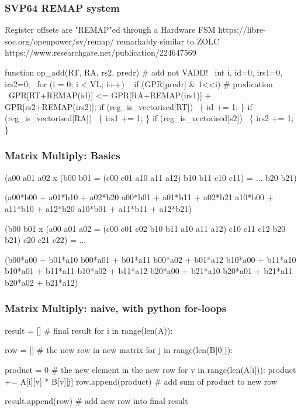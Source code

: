 \documentclass[slidestop]{beamer}
\begin{document}
\begin{frame}[fragile]
\frametitle{SVP64 REMAP system}

\begin{semiverbatim}
Register offsets are "REMAP"ed through a Hardware FSM
https://libre-soc.org/openpower/sv/remap/
remarkably similar to ZOLC
https://www.researchgate.net/publication/224647569

function op\_add(RT, RA, rs2, predr) # add not VADD!
  int i, id=0, irs1=0, irs2=0;
  for (i = 0; i < VL; i++)
    if (GPR[predr] & 1<<i) # predication
       GPR[RT+REMAP(id)] <= GPR[RA+REMAP(irs1)] +
                           GPR[rs2+REMAP(irs2)];
    if (reg\_is\_vectorised[RT])  \{ id += 1; \}
    if (reg\_is\_vectorised[RA])  \{ irs1 += 1; \}
    if (reg\_is\_vectorised[s2])  \{ irs2 += 1; \}
\end{semiverbatim}

\end{frame}

\begin{frame}[fragile]
\frametitle{Matrix Multiply: Basics}

\begin{semiverbatim}
(a00 a01 a02  x (b00 b01   =   (c00 c01
 a10 a11 a12)    b10 b11        c10 c11)  = ...
                 b20 b21)

(a00*b00 + a01*b10 + a02*b20 a00*b01 + a01*b11 + a02*b21
 a10*b00 + a11*b10 + a12*b20 a10*b01 + a11*b11 + a12*b21)

 (b00 b01    x (a00 a01 a02  =   (c00 c01 c02
  b10 b11       a10 a11 a12)      c10 c11 c12
  b20 b21)                        c20 c21 c22)  = ...

(b00*a00 + b01*a10  b00*a01 + b01*a11  b00*a02 + b01*a12
 b10*a00 + b11*a10  b10*a01 + b11*a11  b10*a02 + b11*a12
 b20*a00 + b21*a10  b20*a01 + b21*a11  b20*a02 + b21*a12)

\end{semiverbatim}

\end{frame}


\begin{frame}[fragile]
\frametitle{Matrix Multiply: naive, with python for-loops}

\begin{semiverbatim}
result = [] # final result
for i in range(len(A)):

  row = [] # the new row in new matrix
  for j in range(len(B[0])):

    product = 0 # the new element in the new row
    for v in range(len(A[i])):
        product += A[i][v] * B[v][j]
    row.append(product) # add sum of product to new row

  result.append(row) # add new row into final result
\end{semiverbatim}

\end{frame}
\end{document}
